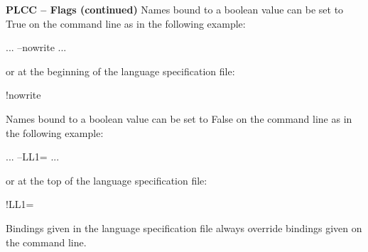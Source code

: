 \begin{minipage}[t]{\sw}
\slidenumber
\LARGE
{\bf PLCC -- Flags (continued)}\exx
Names bound to a boolean value can be set to True
on the command line as in the following example:
{\Large
\begin{qv}
... --nowrite ...
\end{qv}
}
or at the beginning of the language specification file:
{\Large
\begin{qv}
!nowrite
\end{qv}
}
Names bound to a boolean value can be set to False
on the command line as in the following example:
{\Large
\begin{qv}
... --LL1= ...
\end{qv}
}
or at the top of the language specification file:
{\Large
\begin{qv}
!LL1=
\end{qv}
}
Bindings given in the language specification file always override
bindings given on the command line.
\end{minipage}
\clearpage

